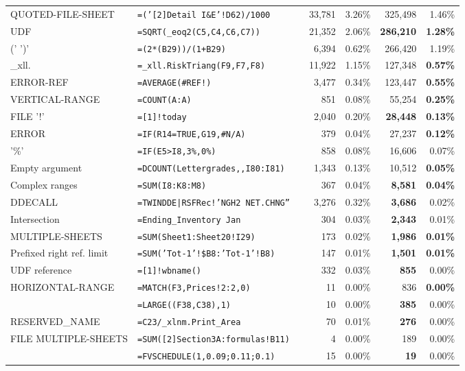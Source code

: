 \begin{tabular}{llrrrrr}
			QUOTED-FILE-SHEET & \texttt{=('[2]Detail I\&E'!D62)/1000} &  & 33,781 & 3.26\% & 325,498 & 1.46\%\\
			UDF & \texttt{=SQRT(_eoq2(C5,C4,C6,C7))} &  & 21,352 & 2.06\% & \textbf{286,210} & \textbf{1.28\%}\\
			(' \synt{Reference} ')' & \texttt{=(2*(B29))/(1+B29)} &  & 6,394 & 0.62\% & 266,420 & 1.19\%\\
			_xll. & \texttt{=_xll.RiskTriang(F9,F7,F8)} &  & 11,922 & 1.15\% & 127,348 & \textbf{0.57\%}\\
			ERROR-REF & \texttt{=AVERAGE(\#REF!)} &  & 3,477 & 0.34\% & 123,447 & \textbf{0.55\%}\\
			VERTICAL-RANGE & \texttt{=COUNT(A:A)} &  & 851 & 0.08\% & 55,254 & \textbf{0.25\%}\\
			FILE '!' & \texttt{=[1]!today} &  & 2,040 & 0.20\% & \textbf{28,448} & \textbf{0.13\%}\\
			ERROR & \texttt{=IF(R14=TRUE,G19,\#N/A)} &  & 379 & 0.04\% & 27,237 & \textbf{0.12\%}\\
			'\%' & \texttt{=IF(E5>I8,3\%,0\%)} &  & 858 & 0.08\% & 16,606 & 0.07\%\\
				Empty argument & \texttt{=DCOUNT(Lettergrades,,I80:I81)} &  & 1,343 & 0.13\% & 10,512 & \textbf{0.05\%}\\
				Complex ranges & \texttt{=SUM(I8:K8:M8)} &  & 367 & 0.04\% & \textbf{8,581} & \textbf{0.04\%}\\
				DDECALL & \texttt{=TWINDDE|RSFRec!'NGH2 NET.CHNG''} &  & 3,276 & 0.32\% & \textbf{3,686} & 0.02\%\\
				Intersection & \texttt{=Ending_Inventory Jan} &  & 304 & 0.03\% & \textbf{2,343} & 0.01\%\\
				MULTIPLE-SHEETS & \texttt{=SUM(Sheet1:Sheet20!I29)} &  & 173 & 0.02\% & \textbf{1,986} & \textbf{0.01\%}\\
				Prefixed right ref. limit & \texttt{=SUM('Tot-1'!\$B8:'Tot-1'!B8)} &  & 147 & 0.01\% & \textbf{1,501} & \textbf{0.01\%}\\
				UDF reference & \texttt{=[1]!wbname()} &  & 332 & 0.03\% & \textbf{855} & 0.00\%\\
				HORIZONTAL-RANGE & \texttt{=MATCH(F3,Prices!2:2,0)} &  & 11 & 0.00\% & 836 & \textbf{0.00\%}\\
				\synt{Union} & \texttt{=LARGE((F38,C38),1)} &  & 10 & 0.00\% & \textbf{385} & 0.00\%\\
				RESERVED_NAME & \texttt{=C23/_xlnm.Print_Area} &  & 70 & 0.01\% & \textbf{276} & 0.00\%\\
				FILE MULTIPLE-SHEETS & \texttt{=SUM([2]Section3A:formulas!B11)} &  & 4 & 0.00\% & 189 & 0.00\%\\
				\synt{ConstantArray} & \texttt{=FVSCHEDULE(1,{0.09;0.11;0.1})} &  & 15 & 0.00\% & \textbf{19} & 0.00\%\\
			\hline
	\end{tabular}
